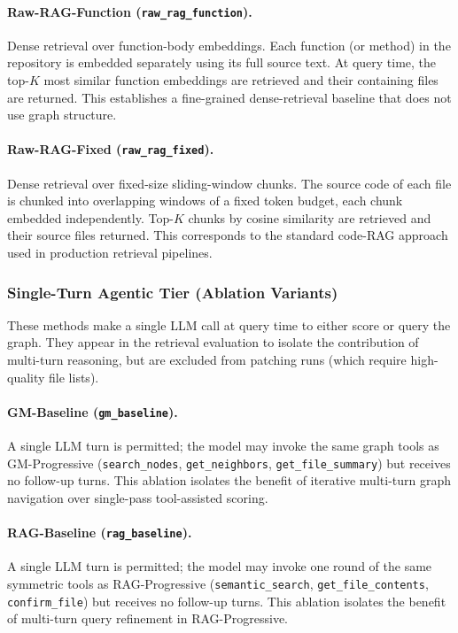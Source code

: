 \paragraph{Raw-RAG-Function (\texttt{raw\_rag\_function}).}
Dense retrieval over function-body embeddings. Each function (or method) in the repository is embedded separately using its full source text. At query time, the top-$K$ most similar function embeddings are retrieved and their containing files are returned. This establishes a fine-grained dense-retrieval baseline that does not use graph structure.

\paragraph{Raw-RAG-Fixed (\texttt{raw\_rag\_fixed}).}
Dense retrieval over fixed-size sliding-window chunks. The source code of each file is chunked into overlapping windows of a fixed token budget, each chunk embedded independently. Top-$K$ chunks by cosine similarity are retrieved and their source files returned. This corresponds to the standard code-RAG approach used in production retrieval pipelines.

\subsubsection{Single-Turn Agentic Tier (Ablation Variants)}
\label{sec:tier_single}

These methods make a single LLM call at query time to either score or query the graph. They appear in the retrieval evaluation to isolate the contribution of multi-turn reasoning, but are excluded from patching runs (which require high-quality file lists).

\paragraph{GM-Baseline (\texttt{gm\_baseline}).}
A single LLM turn is permitted; the model may invoke the same graph tools as GM-Progressive (\texttt{search\_nodes}, \texttt{get\_neighbors}, \texttt{get\_file\_summary}) but receives no follow-up turns. This ablation isolates the benefit of iterative multi-turn graph navigation over single-pass tool-assisted scoring.

\paragraph{RAG-Baseline (\texttt{rag\_baseline}).}
A single LLM turn is permitted; the model may invoke one round of the same symmetric tools as RAG-Progressive (\texttt{semantic\_search}, \texttt{get\_file\_contents}, \texttt{confirm\_file}) but receives no follow-up turns. This ablation isolates the benefit of multi-turn query refinement in RAG-Progressive.

